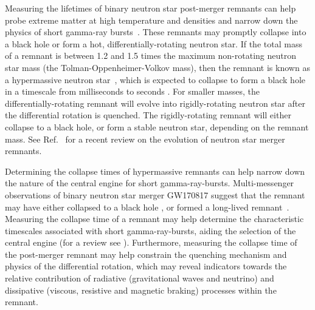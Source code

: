 \documentclass[../Thesis.tex]{subfiles}
\begin{document}
    
    Measuring the lifetimes of binary neutron star post-merger remnants can help probe extreme matter at high temperature and densities and narrow down the physics of short gamma-ray bursts~\cite[e.g.,][]{Zhang2019,Ciolfi2020a}.
    These remnants may promptly collapse into a black hole or form a hot, differentially-rotating neutron star.
    If the total mass of a remnant is between 1.2 and 1.5 times the maximum non-rotating neutron star mass (the Tolman-Oppenheimer-Volkov mass), then the remnant is known as a hypermassive neutron star~\cite{Tolman1939,Oppenheimer1939,Breu2016,Weih2018,Baumgarte2000}, which is expected to collapse to form a black hole in a timescale from milliseconds to seconds \cite{Paschalidis2012}. 
    For smaller masses, the differentially-rotating remnant will evolve into rigidly-rotating neutron star after the differential rotation is quenched.
    The rigidly-rotating remnant will either collapse to a black hole, or form a stable neutron star, depending on the remnant mass.
    See Ref.~\cite{Sarin2021} for a recent review on the evolution of neutron star merger remnants.

    Determining the collapse times of hypermassive remnants can help narrow down the nature of the central engine for short gamma-ray-bursts. 
    Multi-messenger observations of binary neutron star merger GW170817 suggest that the remnant may have either collapsed to a black hole \cite[e.g.,][]{Metzger2018,Gill2019,Murguia-Berthier2021}, or formed a long-lived remnant~\cite[e.g.,][]{Yu2018}.
    Measuring the collapse time of a remnant may help determine the characteristic timescales associated with short gamma-ray-bursts, aiding the selection of the central engine (for a review see \cite{Zhang2019}).
    Furthermore, measuring the collapse time of the post-merger remnant may help constrain the quenching mechanism and physics of the differential rotation, which may reveal indicators towards the relative contribution of radiative (gravitational waves and neutrino) and dissipative (viscous, resistive and magnetic braking) processes within the remnant.\par
\end{document}

